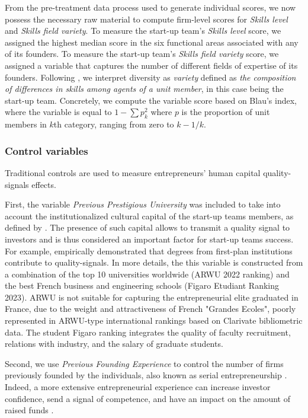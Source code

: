 \documentclass[12pt]{article}
\begin{document}
From the pre-treatment data process used to generate individual scores, we now possess the necessary raw material to compute firm-level scores for \textit{Skills level} and \textit{Skills field variety}. To measure the start-up team's \textit{Skills level} score, we assigned the highest median score in the six functional areas associated with any of its founders. To measure the start-up team's \textit{Skills field variety} score, we assigned a variable that captures the number of different fields of expertise of its founders. Following \citet{harrison2007s}, we interpret diversity as \textit{variety} defined as \textit{the composition of differences in skills among agents of a unit member}, in this case being the start-up team. Concretely, we compute the variable score based on Blau's index, where the variable is equal to $1-\sum p_k^2$ where $p$ is the proportion of unit members in $k$th category, ranging from zero to $k-1/k$.

\subsubsection{Control variables}

Traditional controls are used to measure entrepreneurs' human capital quality-signals effects.

First, the variable \textit{Previous Prestigious University} was included to take into account the institutionalized cultural capital of the start-up teams members, as defined by \citet{bourdieu1979distinction}. The presence of such capital allows to transmit a quality signal to investors and is thus considered an important factor for start-up teams success. For example, \citet{ferrary1999confiance} empirically demonstrated that degrees from first-plan institutions contribute to quality-signals. In more details, the this variable is constructed from a combination of the top 10 universities worldwide (ARWU 2022 ranking) and the best French business and engineering schools (Figaro Etudiant Ranking 2023). ARWU is not suitable for capturing the entrepreneurial elite graduated in France, due to the weight and attractiveness of French "Grandes Ecoles", poorly represented in ARWU-type international rankings based on Clarivate bibliometric data. The student Figaro ranking integrates the quality of faculty recruitment, relations with industry, and the salary of graduate students.

Second, we use \textit{Previous Founding Experience} to control the number of firms previously founded by the individuals, also known as serial entrepreneurship \citep{kirschenhofer2012performance}. Indeed, a more extensive entrepreneurial experience can increase investor confidence, send a signal of competence, and have an impact on the amount of raised funds \citep{hsu2007experienced}.
\end{document}
